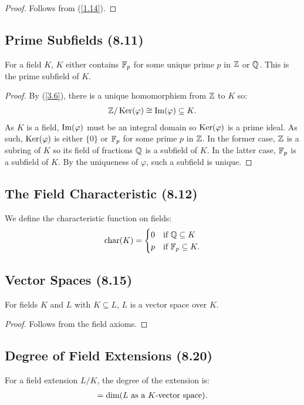 \begin{proof}
    Follows from (\ref{1.14}).
\end{proof}

\subsection{Prime Subfields (8.11)} \label{8.11}

For a field $K$, $K$ either contains $\mathbb{F}_p$ for some unique prime $p$ in $\mathbb{Z}$
or $\mathbb{Q}$. This is the prime subfield of $K$.

\begin{proof}
    By (\ref{3.6}), there is a unique homomorphism from $\mathbb{Z}$ to $K$ so: \begin{align*}
        \mathbb{Z}/\operatorname{Ker}(\varphi) \cong \operatorname{Im}(\varphi) \subseteq K.
    \end{align*} As $K$ is a field, $\operatorname{Im}(\varphi)$ must be an integral domain so
    $\operatorname{Ker}(\varphi)$ is a prime ideal. As such, $\operatorname{Ker}(\varphi)$ is either $\{0\}$ or
    $\mathbb{F}_p$ for some prime $p$ in $\mathbb{Z}$. In the former case, $\mathbb{Z}$ is a
    subring of $K$ so its field of fractions $\mathbb{Q}$ is a subfield of $K$.
    In the latter case, $\mathbb{F}_p$ is a subfield of $K$. By the uniqueness of $\varphi$,
    such a subfield is unique.
\end{proof}

\subsection{The Field Characteristic (8.12)} \label{8.12}

We define the characteristic function on fields: \begin{align*}
    \operatorname{char}(K) = \begin{cases}
        0 & \text{if } \mathbb{Q} \subseteq K \\
        p & \text{if } \mathbb{F}_p \subseteq K.
    \end{cases}
\end{align*}

\subsection{Vector Spaces (8.15)} \label{8.15}

For fields $K$ and $L$ with $K \subseteq L$, $L$ is a vector space
over $K$.

\begin{proof}
    Follows from the field axioms.
\end{proof}

\subsection{Degree of Field Extensions (8.20)} \label{8.20}

For a field extension $L / K$, the degree of the extension is: \begin{align*}
    [L : K] = \Dim(L \text{ as a $K$-vector space}).
\end{align*}
